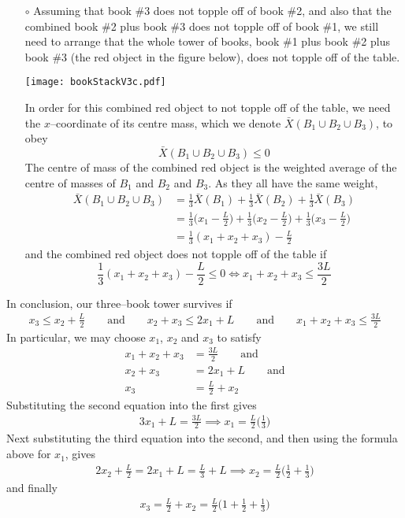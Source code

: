 \begin{itemize}
\begin{itemize}
\item[$\circ$]
Assuming that book \#3 does not topple off of book \#2, and also
that the combined book \#2 plus book \#3 does not topple off of book \#1,
we still need to arrange that the whole tower of books, book \#1 plus
book \#2 plus book \#3 (the red object in the figure below), does not
topple off of the table.
\begin{efig}
\begin{center}
     \texttt{[image: bookStackV3c.pdf]}
\end{center}
\end{efig}
In order for this combined red object to not topple off of the table,
we need the $x$--coordinate of its centre mass, which we denote
$\bar X(B_1\cup B_2\cup B_3)$, to obey
\begin{equation*}
\bar X(B_1\cup B_2\cup B_3) \le 0
\end{equation*}
The centre of mass of the combined red object is the weighted
average  of the centre of masses of $B_1$ and $B_2$ and $B_3$.
As they all have the same weight,
\begin{align*}
\bar X(B_1\cup B_2\cup B_3) &= \frac{1}{3}\bar X(B_1) +\frac{1}{3}\bar X(B_2)
                                +\frac{1}{3}\bar X(B_3) \\
  &=  \frac{1}{3}\Big(x_1-\frac{L}{2}\Big)
     +\frac{1}{3}\Big(x_2-\frac{L}{2}\Big)
     +\frac{1}{3}\Big(x_3-\frac{L}{2}\Big) \\
&= \frac{1}{3}(x_1+x_2+x_3) -\frac{L}{2}
\end{align*}
and the combined red object does not topple off of the table if
\begin{equation*}
\frac{1}{3}(x_1+ x_2+x_3) -\frac{L}{2} \le 0
\iff
x_1+ x_2+x_3\le \frac{3L}{2}
\end{equation*}
\end{itemize}
In conclusion, our three--book tower survives if
\begin{align*}
x_3\le x_2+\frac{L}{2}\qquad\text{and}\qquad x_2+x_3\le 2x_1 + L
\qquad\text{and}\qquad x_1+ x_2+x_3\le \frac{3L}{2}
\end{align*}
In particular, we may choose $x_1$, $x_2$ and $x_3$ to satisfy
\begin{align*}
x_1+ x_2+x_3&= \frac{3L}{2}\qquad\text{and} \\
x_2+x_3&= 2x_1 + L \qquad\text{and} \\
x_3 &= \frac{L}{2} + x_2
\end{align*}
Substituting the second equation into the first gives
\begin{align*}
3x_1 +L = \frac{3L}{2}
\implies x_1 = \frac{L}{2}\Big(\frac{1}{3}\Big)
\end{align*}
Next substituting the third equation into the second, and then
using the formula above for $x_1$, gives
\begin{align*}
2x_2 +\frac{L}{2} = 2x_1+L = \frac{L}{3} + L
\implies x_2 = \frac{L}{2}\Big(\frac{1}{2}+\frac{1}{3}\Big)
\end{align*}
and finally
\begin{align*}
     x_3 = \frac{L}{2} + x_2
         = \frac{L}{2}\Big(1+\frac{1}{2}+\frac{1}{3}\Big)
\end{align*}



\end{itemize}

